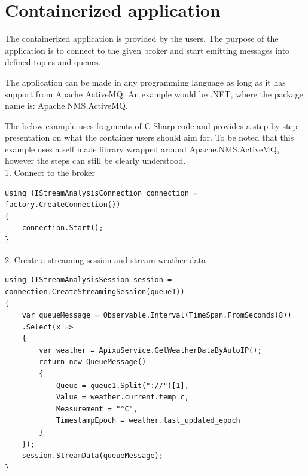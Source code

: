 \section{Containerized application}
\label{chap:04:04}

The containerized application is provided by the users. The purpose of the application is to connect to the given broker and start emitting messages into defined topics and queues.

The application can be made in any programming language as long as it has support from Apache ActiveMQ. An example would be .NET, where the package name is: Apache.NMS.ActiveMQ.

The below example uses fragments of C Sharp code and provides a step by step presentation on what the container users should aim for. To be noted that this example uses a self made library wrapped around Apache.NMS.ActiveMQ, however the steps can still be clearly understood.\\

1. Connect to the broker\\

\begin{lstlisting}
using (IStreamAnalysisConnection connection = factory.CreateConnection())
{
	connection.Start();
}
\end{lstlisting}

2. Create a streaming session and stream weather data\\

\begin{lstlisting}
using (IStreamAnalysisSession session = connection.CreateStreamingSession(queue1))
{
	var queueMessage = Observable.Interval(TimeSpan.FromSeconds(8))
	.Select(x =>
	{
		var weather = ApixuService.GetWeatherDataByAutoIP();
		return new QueueMessage()
		{
			Queue = queue1.Split("://")[1],
			Value = weather.current.temp_c,
			Measurement = "°C",
			TimestampEpoch = weather.last_updated_epoch
		}
	});
	session.StreamData(queueMessage);
}
\end{lstlisting}



